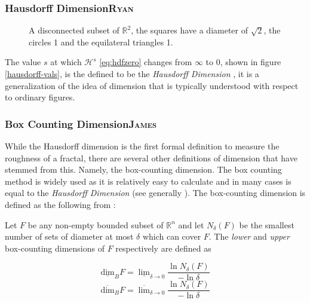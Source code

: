 \documentclass[a4paper,11pt,twoside]{article}
\begin{document}
\subsubsection{Hausdorff Dimension\hfill{}\textsc{Ryan}}
\label{sec:org050fb50}

\begin{figure}
\centering

\caption{\label{abstract-shape}A disconnected subset of \(\mathbb{R}^{2}\), the squares have a diameter of \(\sqrt{2}\), the circles 1 and the equilateral triangles 1.}
\end{figure}


The value \(s\) at which \(\mathcal{H}^{s}\) \eqref{eq:hdfzero} changes from \(\infty\) to 0, shown in figure \ref{hausdorff-vals},  is the defined to be the \emph{Hausdorff Dimension} \cite[\S 2.2]{falconerFractalGeometryMathematical2003b}, it is a generalization of the idea of dimension that is typically understood with respect to ordinary figures.

\subsubsection{Box Counting Dimension\hfill{}\textsc{James}}
\label{box-count-dim}
While the Hausdorff dimension is the first formal definition to measure
the roughness of a fractal, there are several other definitions of dimension
that have stemmed from this. Namely, the box-counting dimension. The box
counting method is widely used as it is relatively easy to calculate \cite[p. 41]{falconerFractalGeometryMathematical2003b}
and in many cases is equal to the \emph{Hausdorff Dimension}  \cite[p. 11]{markpollicottFractalsDimensionTheory2005} (see generally \cite{ListFractalsHausdorff2020}).
The box-counting dimension is defined as the following from
\cite{falconerFractalGeometryMathematical2003}:

Let \(F\) be any non-empty bounded subset of \(\mathbb{R}^n\) and let \(N_\delta(F)\) be the smallest
number of sets of diameter at most \(\delta\) which can cover \(F\). The \emph{lower} and \emph{upper}
box-counting dimensions of \(F\) respectively are defined as

\begin{equation*}
    \underline{\text{dim}}_BF = \underline{\lim}_{\delta \to 0} \frac{\ln N_\delta(F)}{-\ln \delta}
\end{equation*}
\begin{equation*}
\overline{\text{dim}}_BF = \overline{\lim}_{\delta \to 0} \frac{\ln N_\delta(F)}{-\ln \delta}
\end{equation*}
\end{document}
